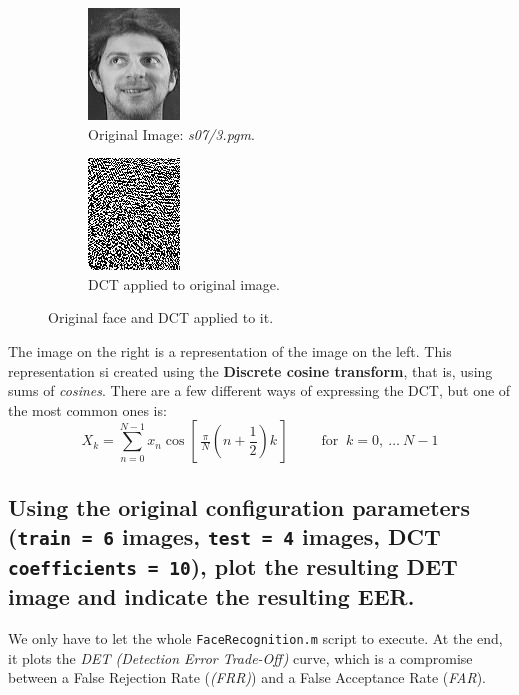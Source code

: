 \documentclass[a4paper]{article}
\def\inline{\lstinline[basicstyle=\ttfamily,keywordstyle={}]}
\begin{document}
\begin{figure}[H]
  \centering
       \begin{subfigure}[t]{0.45\textwidth}
         \centering
         \includegraphics{Figures/Original}
         \caption{Original Image: \emph{s07/3.pgm}.}
     \end{subfigure}%
     \quad
     \begin{subfigure}[t]{0.45\textwidth}
         \centering
         \includegraphics{Figures/Original-DCT}
         \caption{DCT applied to original image.}
     \end{subfigure}
    \caption{Original face and DCT applied to it.}
    \label{fig:ex1a}
\end{figure}

The image on the right is a representation of the image on the left. This representation si created using the \textbf{Discrete cosine transform}, that is, using sums of \emph{cosines}. There are a few different ways of expressing the DCT, but one of the most common ones is:
\[
 X_{k}=\sum _{n=0}^{N-1}x_{n}\cos \left[\,{\tfrac {\,\pi \,}{N}}\left(n+{\frac {1}{2}}\right)k\,\right]\qquad {\text{ for }}~k=0,\ \dots \ N-1
\]

\subsection{Using the original configuration parameters (\inline{train = 6} images, \inline{test = 4} images, DCT \inline{coefficients = 10}), plot the resulting DET image and indicate the resulting EER.}

We only have to let the whole \inline{FaceRecognition.m} script to execute. At the end, it plots the \emph{DET (Detection Error Trade-Off)} curve, which is a compromise between a False Rejection Rate (\emph{(FRR)}) and a False Acceptance Rate (\emph{FAR}). 
\end{document}

